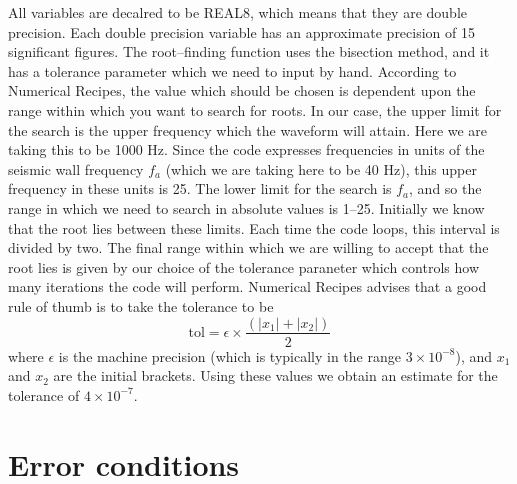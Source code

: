\documentclass[12pt]{article}
\begin{document}
All variables are decalred to be REAL8, which means that they are double precision.
Each double precision variable has an approximate precision of 15 significant figures. The root--finding function uses the bisection method, and it has a tolerance parameter which we need to input by hand. According to Numerical Recipes, the value which should be chosen is dependent upon the range within which you want to search for roots. In our case, the upper limit for the search is the upper frequency which the waveform will attain. Here we are taking this to be 1000 Hz. Since the code expresses frequencies in units of the seismic wall frequency $f_{a}$ (which we are taking here to be 40 Hz), this upper frequency in these units is 25. The lower limit for the search is $f_{a}$, and so the range in which we need to search in absolute values is 1--25. Initially we know that the root lies between these limits. Each time the code loops, this interval is divided by two. The final range within which we are willing to accept that the root lies is given by our choice of the tolerance paraneter which controls how many iterations the code will perform. Numerical Recipes advises that a good rule of thumb is to take the tolerance to be
\begin{equation}
\mathrm{tol} = \epsilon \times \frac{(|x_{1}|+|x_{2}|)}{2}
\end{equation}
where $\epsilon$ is the machine precision (which is typically in the range $3 \times 10^{-8}$), and $x_{1}$ and $x_{2}$ are the initial brackets. Using these values we obtain an estimate for the tolerance of $4 \times 10^{-7}$.




\section{Error conditions}
\end{document}
